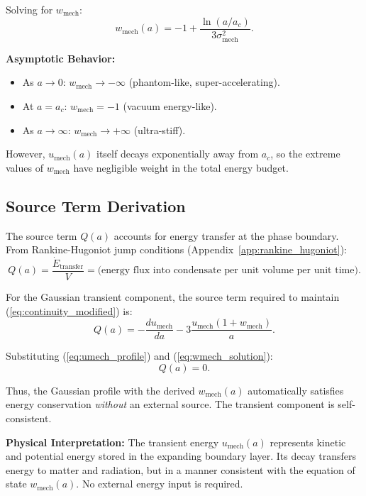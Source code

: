 \documentclass[11pt,a4paper]{article}
\newcommand{\umech}{\ensuremath{u_{\mathrm{mech}}}}
\newcommand{\wmech}{\ensuremath{w_{\mathrm{mech}}}}
\theoremstyle{definition}
\theoremstyle{remark}
\begin{document}
Solving for $\wmech$:
\begin{equation}
\label{eq:wmech_solution}
\boxed{\wmech(a) = -1 + \frac{\ln(a/a_c)}{3\sigma_{\mathrm{mech}}^2}.}
\end{equation}

\textbf{Asymptotic Behavior:}
\begin{itemize}[leftmargin=*, itemsep=0.2em]
\item As $a \to 0$: $\wmech \to -\infty$ (phantom-like, super-accelerating).
\item At $a = a_c$: $\wmech = -1$ (vacuum energy-like).
\item As $a \to \infty$: $\wmech \to +\infty$ (ultra-stiff).
\end{itemize}

However, $\umech(a)$ itself decays exponentially away from $a_c$, so the extreme values of $\wmech$ have negligible weight in the total energy budget.

\subsection{Source Term Derivation}
\label{sec:source_term}

The source term $Q(a)$ accounts for energy transfer at the phase boundary. From Rankine-Hugoniot jump conditions (Appendix~\ref{app:rankine_hugoniot}):
\begin{equation}
Q(a) = \frac{\dot{E}_{\mathrm{transfer}}}{V} = \text{(energy flux into condensate per unit volume per unit time)}.
\end{equation}

For the Gaussian transient component, the source term required to maintain (\ref{eq:continuity_modified}) is:
\begin{equation}
\label{eq:source_term}
Q(a) = -\frac{d\umech}{da} - 3\frac{\umech(1 + \wmech)}{a}.
\end{equation}

Substituting (\ref{eq:umech_profile}) and (\ref{eq:wmech_solution}):
\begin{equation}
Q(a) = 0.
\end{equation}

Thus, the Gaussian profile with the derived $\wmech(a)$ automatically satisfies energy conservation \emph{without} an external source. The transient component is self-consistent.

\textbf{Physical Interpretation:} The transient energy $\umech(a)$ represents kinetic and potential energy stored in the expanding boundary layer. Its decay transfers energy to matter and radiation, but in a manner consistent with the equation of state $\wmech(a)$. No external energy input is required.
\end{document}
